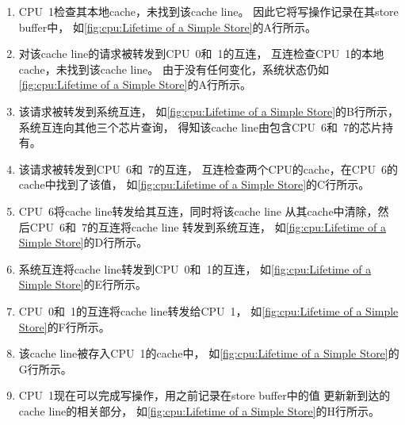 \begin{enumerate}
\item	CPU~1检查其本地cache，未找到该cache line。
	因此它将写操作记录在其store buffer中，
	如\cref{fig:cpu:Lifetime of a Simple Store}的A行所示。
\item	对该cache line的请求被转发到CPU~0和~1的互连，
	互连检查CPU~1的本地cache，未找到该cache line。
	由于没有任何变化，系统状态仍如
	\cref{fig:cpu:Lifetime of a Simple Store}的A行所示。
\item	该请求被转发到系统互连，
	如\cref{fig:cpu:Lifetime of a Simple Store}的B行所示，
	系统互连向其他三个芯片查询，
	得知该cache line由包含CPU~6和~7的芯片持有。
\item	该请求被转发到CPU~6和~7的互连，
	互连检查两个CPU的cache，在CPU~6的cache中找到了该值，
	如\cref{fig:cpu:Lifetime of a Simple Store}的C行所示。
\item	CPU~6将cache line转发给其互连，同时将该cache line
	从其cache中清除，然后CPU~6和~7的互连将cache line
	转发到系统互连，
	如\cref{fig:cpu:Lifetime of a Simple Store}的D行所示。
\item	系统互连将cache line转发到CPU~0和~1的互连，
	如\cref{fig:cpu:Lifetime of a Simple Store}的E行所示。
\item	CPU~0和~1的互连将cache line转发给CPU~1，
	如\cref{fig:cpu:Lifetime of a Simple Store}的F行所示。
\item	该cache line被存入CPU~1的cache中，
	如\cref{fig:cpu:Lifetime of a Simple Store}的G行所示。
\item	CPU~1现在可以完成写操作，用之前记录在store buffer中的值
	更新新到达的cache line的相关部分，
	如\cref{fig:cpu:Lifetime of a Simple Store}的H行所示。
\end{enumerate}


